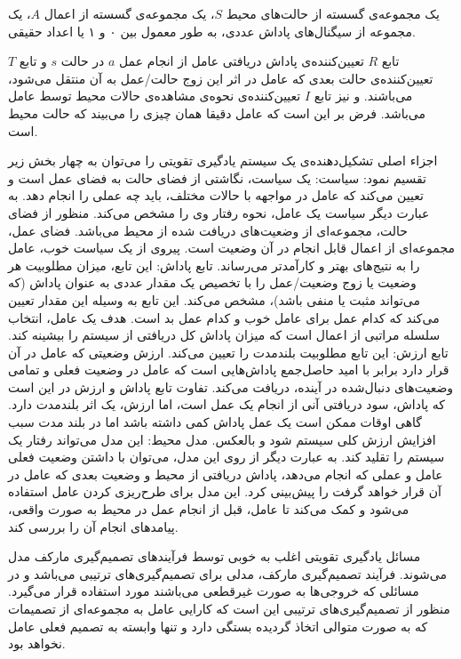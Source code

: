  یک مجموعه‌ی گسسته از حالت‌های محیط $S$،
 یک مجموعه‌ی گسسته از اعمال $A$،
 یک مجموعه از سیگنال‌های پاداش عددی، به طور معمول بین ۰ و ۱ یا اعداد حقیقی.

تابع $R$ تعیین‌کننده‌ی پاداش دریافتی عامل از انجام عمل $a$ در حالت $s$ و تابع $T$ تعیین‌کننده‌ی حالت
بعدی که عامل در اثر این زوج حالت/عمل به آن منتقل می‌شود، می‌باشند. و نیز تابع $I$ تعیین‌کننده‌ی نحوه‌ی مشاهده‌ی حالات محیط توسط عامل می‌باشد. فرض بر این است که عامل
دقیقا همان چیزی را می‌بیند که حالت محیط است.

اجزاء اصلی تشکیل‌دهنده‌ی یک سیستم یادگیری تقویتی را می‌توان به چهار بخش زیر تقسیم نمود:
 سیاست:
یک سیاست، نگاشتی از فضای حالت به فضای عمل است و تعیین می‌کند که عامل در
مواجهه با حالات مختلف، باید چه عملی را انجام دهد. به عبارت دیگر سیاست یک عامل، نحوه 
رفتار وی را مشخص می‌کند. منظور از فضای حالت، مجموعه‌ای از وضعیت‌های دریافت شده از محیط می‌باشد. فضای عمل، مجموعه‌ای از اعمال قابل انجام در آن وضعیت است. پیروی از یک
سیاست خوب، عامل را به نتیج‌های بهتر و کارآمدتر می‌رساند.
 تابع پاداش:
این تابع، میزان مطلوبیت هر وضعیت یا زوج وضعیت/عمل را با تخصیص یک مقدار
عددی به عنوان پاداش (که می‌تواند مثبت یا منفی باشد)، مشخص می‌کند. این تابع به وسیله این  مقدار تعیین می‌کند که کدام عمل برای عامل خوب و کدام عمل بد است. هدف یک عامل، انتخاب
سلسله مراتبی از اعمال است که میزان پاداش کل دریافتی از سیستم را بیشینه کند.
 تابع ارزش:
این تابع مطلوبیت بلندمدت را تعیین می‌کند. ارزش وضعیتی که عامل در آن قرار دارد
برابر با امید حاصل‌جمع پاداش‌هایی است که عامل در وضعیت فعلی و تمامی وضعیت‌های دنبال‌شده
 در آینده، دریافت می‌کند. تفاوت تابع پاداش و ارزش در این است که پاداش، سود دریافتی آنی از انجام یک عمل است، اما ارزش، یک اثر بلندمدت دارد. گاهی اوقات ممکن است یک عمل پاداش
کمی داشته باشد اما در بلند مدت سبب افزایش ارزش کلی سیستم شود و بالعکس.
 مدل محیط:
این مدل می‌تواند رفتار یک سیستم را تقلید کند. به عبارت دیگر از روی این مدل،
می‌توان با داشتن وضعیت فعلی عامل و عملی که انجام می‌دهد، پاداش دریافتی از محیط و وضعیت  بعدی که عامل در آن قرار خواهد گرفت را پیش‌بینی کرد. این مدل برای طرح‌ریزی کردن عامل استفاده می‌شود و کمک می‌کند تا عامل، قبل از انجام عمل در محیط به صورت واقعی، پیامدهای
انجام آن را بررسی کند.

مسائل یادگیری تقویتی اغلب به خوبی توسط فرآیندهای تصمیم‌گیری مارکف مدل می‌شوند.
فرآیند تصمیم‌گیری مارکف، مدلی برای تصمیم‌گیری‌های ترتیبی می‌باشد و در مسائلی که خروجی‌ها به صورت غیرقطعی می‌باشند مورد استفاده قرار می‌گیرد. منظور از تصمیم‌گیری‌های ترتیبی این است که کارایی عامل به مجموعه‌ای از تصمیمات که به صورت متوالی اتخاذ گردیده بستگی دارد و تنها وابسته به تصمیم فعلی
عامل نخواهد بود.

